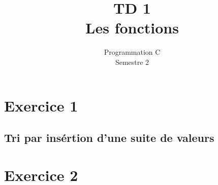 \documentclass{article}
\title{TD 1\\ Les fonctions}
\date{Programmation C\\ Semestre 2}
\begin{document}
	\maketitle
	\section{Exercice 1}
		\subsection{Tri par insértion d'une suite de valeurs}
				
		\subsection{}
				
				
		\subsection{}
				
	\section{Exercice 2}	
		\subsection{}
			
		\subsection{}
			
		\subsection{}
			
		
\end{document}

